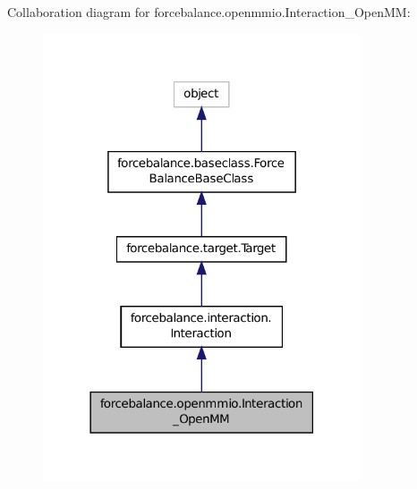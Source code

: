 Collaboration diagram for forcebalance.\-openmmio.\-Interaction\-\_\-\-Open\-M\-M\-:
\nopagebreak
\begin{figure}[H]
\begin{center}
\leavevmode
\includegraphics[width=266pt]{classforcebalance_1_1openmmio_1_1Interaction__OpenMM__coll__graph}
\end{center}
\end{figure}
